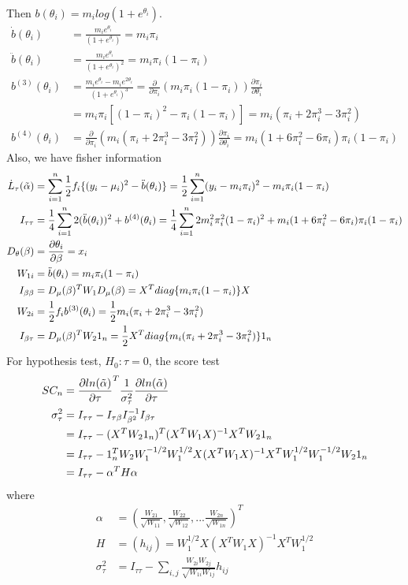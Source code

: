 \documentclass[11pt]{article} %
\begin{document}
Then $b(\theta_i) = m_i log(1+ e^{\theta_i})$. 
\begin{align*}
	\dot{b}(\theta_i) &= \frac{m_i e^{\theta_i}}{(1+e^{\theta_i})} = m_i \pi_i\\
	\ddot{b}(\theta_i) &= \frac{m_i e^{\theta_i}}{(1+e^{\theta_i})^2} = m_i \pi_i (1-\pi_i)\\
	b^{(3)}(\theta_i) &= \frac{m_i e^{\theta_i} - m_i e^{2 \theta_i}}{(1+e^{\theta_i})^3} = \frac{\partial}{\partial \pi_i} \left( m_i \pi_i (1-\pi_i) \right) \frac{\partial \pi_i}{\partial \theta_i}\\ &= m_i \pi_i [(1-\pi_i)^2 - \pi_i(1-\pi_i)] = m_i(\pi_i + 2\pi_i^3 -3\pi_i^2)\\
	b^{(4)}(\theta_i) &= \frac{\partial}{\partial \pi_i}  \left( m_i(\pi_i + 2\pi_i^3 -3\pi_I^2) \right) \frac{\partial \pi_i}{\partial \theta_i} = m_i(1 + 6\pi_i^2 -6 \pi_i)\pi_i(1-\pi_i)
\end{align*}
Also, we have fisher information
\begin{align*}
	\dot{L}_{\tau}(\Tilde{\alpha}) &=  \sum_{i=1}^n \frac{1}{2} f_i\{ (y_i-\mu_i)^2- \ddot{b}(\theta_i)\}  = \frac{1}{2} \sum_{i=1}^n (y_i- m_i\pi_i )^2- m_i \pi_i (1-\pi_i)\\
	I_{\tau\tau} &=\frac{1}{4} \sum_{i=1}^n 2 (\ddot{b}(\theta_i))^2 + b^{(4)}(\theta_i)= \frac{1}{4} \sum_{i=1}^n  2 m_i^2 \pi_i^2 (1-\pi_i)^2 + m_i(1 + 6\pi_i^2 -6 \pi_i)\pi_i(1-\pi_i)   \\
	D_{\theta}(\beta) &= \frac{\partial \theta_i}{\partial \beta}= x_i\\
	W_{1i} &= \ddot{b}(\theta_i) = m_i \pi_i (1-\pi_i)\\
	I_{\beta \beta} &= D_{\mu}(\beta)^T  W_1 D_{\mu}(\beta) = X^T diag \{m_i \pi_i (1-\pi_i)\}X\\
	W_{2i} &= \frac{1}{2} f_i b^{(3)}(\theta_i) =\frac{1}{2} m_i(\pi_i + 2\pi_i^3 -3\pi_i^2)\\
	I_{\beta \tau} &= D_{\mu}(\beta)^T W_2 1_n = \frac{1}{2} X^T diag\{ m_i(\pi_i + 2\pi_i^3 -3\pi_i^2)\} 1_n
\end{align*}
For hypothesis test, $H_0: \tau = 0$, the score test
\begin{align*}
	SC_n &= \frac{\partial ln(\Tilde{\alpha})}{\partial \tau}^T \frac{1}{\sigma_{\tau}^2} \frac{\partial ln(\Tilde{\alpha})}{\partial \tau}\\
	\sigma_{\tau}^2 &= I_{\tau \tau} - I_{\tau \beta} I_{\beta^2}^{-1} I_{\beta \tau} \\
	&= I_{\tau\tau} -  (X^T W_2 1_n)^T (X^T W_1 X)^{-1} X^T W_2 1_n \\
	&=I_{\tau\tau} - 1_n^T W_2 W_1^{-1/2} W_1^{1/2} X (X^T W_1 X)^{-1} X^T W_1^{1/2} W_1^{-1/2} W_2 1_n \\
	&= I_{\tau\tau} - \alpha^T  H \alpha
\end{align*}
where 
\begin{align*}
	\alpha &= \left( \frac{W_{21}}{\sqrt{W_{11}}}, \frac{W_{22}}{\sqrt{W_{12}}} ,... \frac{W_{2n}}{\sqrt{W_{1n}}} \right)^T\\
	H &= (h_{ij}) = W_1^{1/2} X (X^T W_1 X)^{-1} X^T W_1^{1/2}\\
	\sigma^2_{\tau} &= I_{\tau\tau} - \sum_{i,j} \frac{W_{2i}W_{2j}}{\sqrt{W_{1i}W_{1j}}} h_{ij}
\end{align*}
\end{document}

